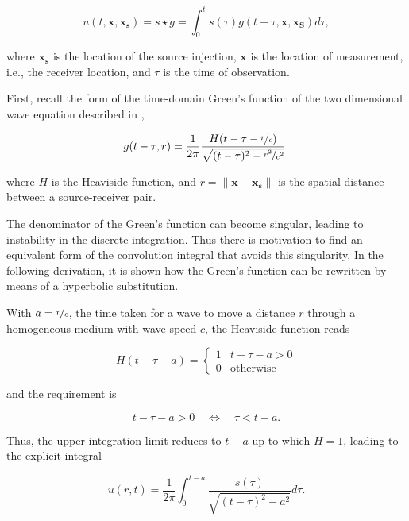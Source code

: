 \documentclass[final-report]{report-template}
\begin{document}
\begin{equation}
    u(t, \mathbf{x}, \mathbf{x_s}) = s \star g = \int^t_0 s(\tau)g(t - \tau, \mathbf{x}, \mathbf{x_S}) d\tau,
    \label{eq:conv_integral}
\end{equation}

where $\mathbf{x_s}$ is the location of the source injection, $\mathbf{x}$ is the location of measurement, i.e., the receiver location, and $\tau$ is the time of observation.

First, recall the form of the time-domain Green's function of the two dimensional wave equation described in \cite{greens-wave},

\begin{equation}
    g(t - \tau, r) = \frac{1}{2\pi}\frac{H(t - \tau - \nicefrac{r}{c})}{\sqrt{(t-\tau)^2 - \nicefrac{r^2}{c^2}}}.
    \label{eq:greens}
\end{equation}

where $H$ is the Heaviside function, and $r = \|\mathbf{x} - \mathbf{x_s}\|$ is the spatial distance between a source-receiver pair.

The denominator of the Green's function can become singular, leading to instability in the discrete integration. Thus there is motivation to find an equivalent form of the convolution integral that avoids this singularity. In the following derivation, it is shown how the Green's function can be rewritten by means of a hyperbolic substitution.

With $a = \nicefrac{r}{c}$, the time taken for a wave to move a distance $r$ through a homogeneous medium with wave speed $c$, the Heaviside function reads

\begin{equation}
    H(t - \tau - a) = 
    \begin{cases}
    1 & t - \tau - a > 0 \\
    0 & \text{otherwise}
    \end{cases}
\end{equation}

and the requirement is

\begin{equation}
    t - \tau - a > 0 \quad \Longleftrightarrow \quad \tau < t - a.
\end{equation}

Thus, the upper integration limit reduces to $t-a$ up to which $H = 1$, leading to the explicit integral

\begin{equation}
    u(r, t) = \frac{1}{2\pi} \int^{t-a}_0 \frac{s(\tau)}{\sqrt{(t-\tau)^2 - a^2}} d\tau.
\end{equation}
\end{document}

